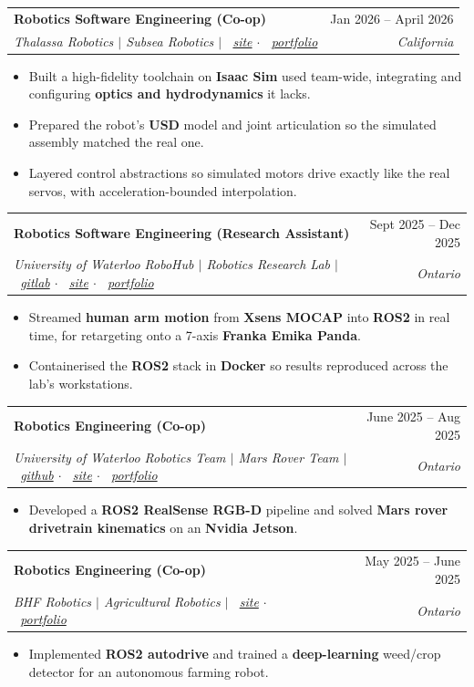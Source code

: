 \documentclass[letterpaper,10pt]{article}
\makeatletter
\newcommand{\ghlink}[1]{{\color{uwpurple}\faGithub\ \href{#1}{github}}}
\newcommand{\stlink}[1]{{\color{uwpurple}\faGlobe\ \href{#1}{site}}}
\newcommand{\gllink}[1]{{\color{uwpurple}\faGitlab\ \href{#1}{gitlab}}}
\newcommand{\pflink}[1]{{\color{uwpurple}\faIcon{external-link-alt}\ \href{#1}{portfolio}}}
\newcommand{\resumeItem}[1]{
  \item\small{#1}\vspace{-2pt}
}
\newcommand{\resumeSubheading}[4]{
  \vspace{-2pt}\item
    \begin{tabular*}{\textwidth}[t]{l@{\extracolsep{\fill}}r}
      \textbf{#1} & #2 \\
      \textit{\small#3} & \textit{\small #4} \\
    \end{tabular*}\vspace{-7pt}
}
\newcommand{\resumeItemListStart}{\begin{itemize}}
\newcommand{\resumeItemListEnd}{\end{itemize}\vspace{-5pt}}
\makeatother
\begin{document}
    \resumeSubheading
      {Robotics Software Engineering (Co-op)}{Jan 2026 -- April 2026}
      {Thalassa Robotics $|$ Subsea Robotics $|$ \stlink{https://www.thalassainc.com/} $\cdot$ \pflink{https://bjahoor.github.io/projects/thalassa-simulation-toolchain}}{California}
      \resumeItemListStart
        \resumeItem{Built a high-fidelity toolchain on \textbf{Isaac Sim} used team-wide, integrating
          and configuring \textbf{optics and hydrodynamics} it lacks.}
        \resumeItem{Prepared the robot's \textbf{USD} model and joint articulation so the simulated
          assembly matched the real one.}
        \resumeItem{Layered control abstractions so simulated motors drive exactly like the real
          servos, with acceleration-bounded interpolation.}
      \resumeItemListEnd

    \resumeSubheading
      {Robotics Software Engineering (Research Assistant)}{Sept 2025 -- Dec 2025}
      {University of Waterloo RoboHub $|$ Robotics Research Lab $|$ \gllink{https://git.uwaterloo.ca/bjahoor/xsens-panda} $\cdot$ \stlink{https://uwaterloo.ca/robohub/} $\cdot$ \pflink{https://bjahoor.github.io/projects/uw-robohub-research}}{Ontario}
      \resumeItemListStart
        \resumeItem{Streamed \textbf{human arm motion} from \textbf{Xsens MOCAP} into \textbf{ROS2}
          in real time, for retargeting onto a 7-axis \textbf{Franka Emika Panda}.}
        \resumeItem{Containerised the \textbf{ROS2} stack in \textbf{Docker} so results
          reproduced across the lab's workstations.}
      \resumeItemListEnd

    \resumeSubheading
      {Robotics Engineering (Co-op)}{June 2025 -- Aug 2025}
      {University of Waterloo Robotics Team $|$ Mars Rover Team $|$ \ghlink{https://github.com/bjahoor/cam_package} $\cdot$ \stlink{https://uwroboticsmarketing.github.io/} $\cdot$ \pflink{https://bjahoor.github.io/projects/mars-style-rover}}{Ontario}
      \resumeItemListStart
        \resumeItem{Developed a \textbf{ROS2 RealSense RGB-D} pipeline and solved \textbf{Mars rover
          drivetrain kinematics} on an \textbf{Nvidia Jetson}.}
      \resumeItemListEnd

    \resumeSubheading
      {Robotics Engineering (Co-op)}{May 2025 -- June 2025}
      {BHF Robotics $|$ Agricultural Robotics $|$ \stlink{https://bhfrobotics.com/} $\cdot$ \pflink{https://bjahoor.github.io/projects/autonomous-electric-weeder}}{Ontario}
      \resumeItemListStart
        \resumeItem{Implemented \textbf{ROS2 autodrive} and trained a \textbf{deep-learning}
          weed/crop detector for an autonomous farming robot.}
      \resumeItemListEnd
\end{document}
